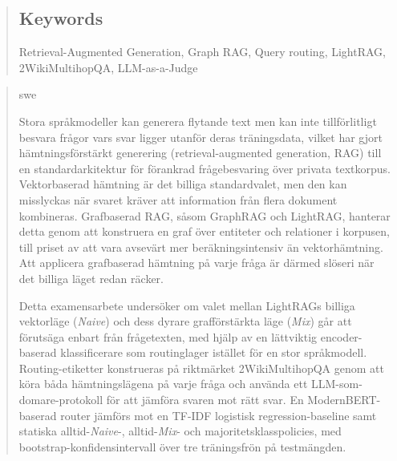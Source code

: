 \documentclass[english, bibtex]{kththesis}               %
\numberwithin{listing}{chapter}
\begin{document}
\begin{abstract}
\subsection*{Keywords}
\begin{scontents}[store-env=keywords,print-env=true]
Retrieval-Augmented Generation, Graph RAG, Query routing, LightRAG, 2WikiMultihopQA, LLM-as-a-Judge
\end{scontents}
\end{abstract}
\cleardoublepage
{}
\begin{abstract}
    \markboth{\abstractname}{}
\begin{scontents}[store-env=lang]
swe
\end{scontents}

\begin{scontents}[store-env=abstracts,print-env=true]
Stora språkmodeller kan generera flytande text men kan inte tillförlitligt besvara frågor vars svar ligger utanför deras träningsdata, vilket har gjort hämtningsförstärkt generering (retrieval-augmented generation, RAG) till en standardarkitektur för förankrad frågebesvaring över privata textkorpus. Vektorbaserad hämtning är det billiga standardvalet, men den kan misslyckas när svaret kräver att information från flera dokument kombineras. Grafbaserad RAG, såsom GraphRAG och LightRAG, hanterar detta genom att konstruera en graf över entiteter och relationer i korpusen, till priset av att vara avsevärt mer beräkningsintensiv än vektorhämtning. Att applicera grafbaserad hämtning på varje fråga är därmed slöseri när det billiga läget redan räcker.

Detta examensarbete undersöker om valet mellan LightRAGs billiga vektorläge (\emph{Naive}) och dess dyrare grafförstärkta läge (\emph{Mix}) går att förutsäga enbart från frågetexten, med hjälp av en lättviktig encoder-baserad klassificerare som routinglager istället för en stor språkmodell. Routing-etiketter konstrueras på riktmärket 2WikiMultihopQA genom att köra båda hämtningslägena på varje fråga och använda ett LLM-som-domare-protokoll för att jämföra svaren mot rätt svar. En ModernBERT-baserad router jämförs mot en TF-IDF logistisk regression-baseline samt statiska alltid-\emph{Naive}-, alltid-\emph{Mix}- och majoritetsklasspolicies, med bootstrap-konfidensintervall över tre träningsfrön på testmängden.


\end{scontents}
\end{abstract}
\end{document}
